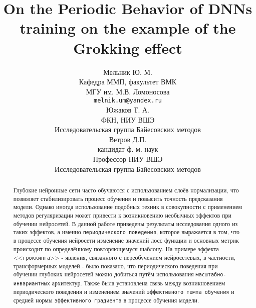 \documentclass{article}
\title{On the Periodic Behavior of DNNs training on the example of
the Grokking effect}
\author{ Мельник Ю. М. \\
	Кафедра ММП, факультет ВМК \\
    МГУ им. М.В. Ломоносова\\
	\texttt{melnik.um@yandex.ru} \\
	\And
    Южаков Т. А.\\
	ФКН, НИУ ВШЭ\\
    Исследовательская группа Байесовских методов\\
    \And
    Ветров Д.П.\\
    кандидат ф.-м. наук\\
    Профессор НИУ ВШЭ\\
    Исследовательская группа Байесовских методов\\
}
\date{}
\begin{document}
\maketitle

\begin{abstract}
	Глубокие нейронные сети часто обучаются с использованием слоёв нормализации, что позволяет стабилизировать процесс обучения и повысить точность предсказания модели. Однако иногда использование подобных техник в совокупности с применением методов регуляризации может привести к возникновению необычных эффектов при обучении нейросетей. В данной работе приведены результаты исследования одного из таких эффектов, а именно \verb|периодического поведения|, которое выражается в том, что в процессе обучения нейросети изменение значений лосс функции и основных метрик происходит по определённому повторяющемуся шаблону. На примере эффекта <<\verb|гроккинга|>> - явления, связанного с переобучением нейросетевых, в частности, трансформерных моделей - было показано, что периодического поведения при обучении глубоких нейросетей можно добиться путём использования \verb|масштабно-инвариантных| архитектур. Также была установлена связь между возникновением периодического поведения и изменением значений \verb|эффективного темпа обучения| и средней нормы \verb|эффективного градиента| в процессе обучения модели.  
\end{abstract}

\end{document}
